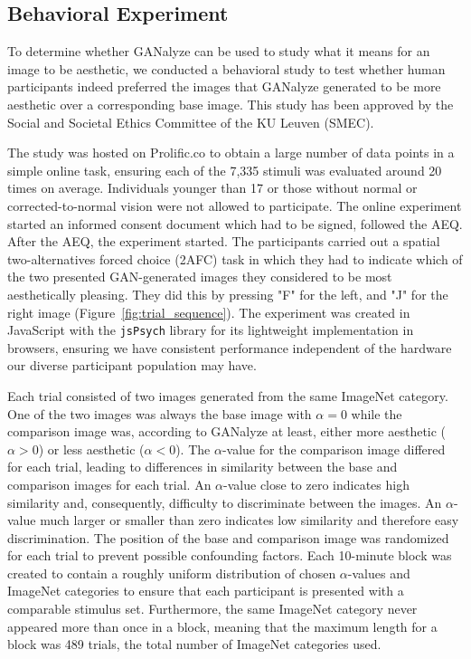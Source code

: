 \documentclass[../main.tex]{subfiles}
\begin{document}
	
	
\subsection{Behavioral Experiment}
To determine whether GANalyze can be used to study what it means for an image to be aesthetic, we conducted a behavioral study to test whether human participants indeed preferred the images that GANalyze generated to be more aesthetic over a corresponding base image. This study has been approved by the Social and Societal Ethics Committee of the KU Leuven (SMEC).
	
The study was hosted on Prolific.co to obtain a large number of data points in a simple online task, ensuring each of the 7,335 stimuli was evaluated around 20 times on average. Individuals younger than 17 or those without normal or corrected-to-normal vision were not allowed to participate. The online experiment started an informed consent document which had to be signed, followed the AEQ. After the AEQ, the experiment started.	The participants carried out a spatial two-alternatives forced choice (2AFC) task in which they had to indicate which of the two presented GAN-generated images they considered to be most aesthetically pleasing. They did this by pressing "F" for the left, and "J" for the right image (Figure~\ref{fig:trial_sequence}). The experiment was created in JavaScript with the \texttt{jsPsych} library \parencite{de2015jspsych} for its lightweight implementation in browsers, ensuring we have consistent performance independent of the hardware our diverse participant population may have.
	
Each trial consisted of two images generated from the same ImageNet category. One of the two images was always the base image with $\alpha = 0$ while the comparison image was, according to GANalyze at least, either more aesthetic ($\alpha > 0$) or less aesthetic ($\alpha < 0$). The $\alpha$-value for the comparison image differed for each trial, leading to differences in similarity between the base and comparison images for each trial. An $\alpha$-value close to zero indicates high similarity and, consequently, difficulty to discriminate between the images. An $\alpha$-value much larger or smaller than zero indicates low similarity and therefore easy discrimination. The position of the base and comparison image was randomized for each trial to prevent possible confounding factors. Each 10-minute block was created to contain a roughly uniform distribution of chosen $\alpha$-values and ImageNet categories to ensure that each participant is presented with a comparable stimulus set. Furthermore, the same ImageNet category never appeared more than once in a block, meaning that the maximum length for a block was 489 trials, the total number of ImageNet categories used.
	
\end{document}
